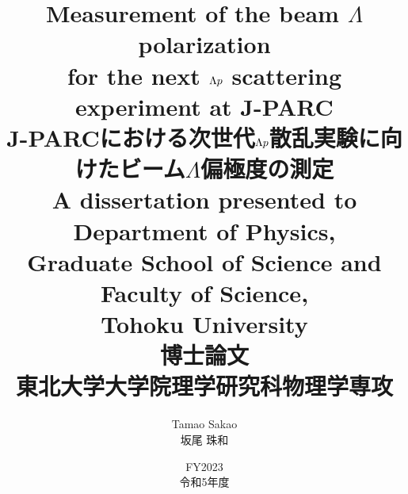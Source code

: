 %

\title{
\vspace{30pt}
Measurement of the beam $\Lambda$ polarization \\for the next $\Lambda p$ scattering experiment at J-PARC\\
\vspace{30pt}
J-PARCにおける次世代$\Lambda p$散乱実験に向けたビーム$\Lambda$偏極度の測定\\
\vspace{60pt}
\large{
A dissertation presented to\\
Department of Physics,\\
Graduate School of Science and Faculty of Science,\\
Tohoku University\\
}
\vspace{30pt}
\large{
博士論文\\
東北大学大学院理学研究科物理学専攻\\
}
}
\vspace{60pt}
\author{
Tamao Sakao\\
坂尾 珠和}
\vspace{60pt}
\date{FY2023\\令和5年度}
\maketitle
\thispagestyle{empty}
%
